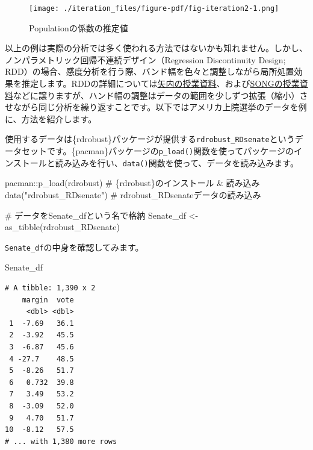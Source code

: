 \documentclass[
  a4paper,
  pandoc,
  ja=standard,
  jafont=haranoaji]{bxjsbook}
\newenvironment{Shaded}{\begin{snugshade}}{\end{snugshade}}
\newcommand{\CommentTok}[1]{\textcolor[rgb]{0.37,0.37,0.37}{#1}}
\newcommand{\FunctionTok}[1]{\textcolor[rgb]{0.28,0.35,0.67}{#1}}
\newcommand{\NormalTok}[1]{\textcolor[rgb]{0.00,0.48,0.65}{#1}}
\newcommand{\OtherTok}[1]{\textcolor[rgb]{0.00,0.48,0.65}{#1}}
\newcommand{\SpecialCharTok}[1]{\textcolor[rgb]{0.37,0.37,0.37}{#1}}
\newcommand{\StringTok}[1]{\textcolor[rgb]{0.13,0.47,0.30}{#1}}
\begin{document}
\begin{figure}[H]

{\centering \texttt{[image: ./iteration\_files/figure-pdf/fig-iteration2-1.png]}

}

\caption{\label{fig-iteration2}Populationの係数の推定値}

\end{figure}

以上の例は実際の分析では多く使われる方法ではないかも知れません。しかし、ノンパラメトリック回帰不連続デザイン（Regression
Discontinuity Design;
RDD）の場合、感度分析を行う際、バンド幅を色々と調整しながら局所処置効果を推定します。RDDの詳細については\href{https://yukiyanai.github.io/econometrics2/regression-discontinuity.html}{矢内の授業資料}、および\href{https://www.jaysong.net/post/kobe2020-qpm1/}{SONGの授業資料}などに譲りますが、ハンド幅の調整はデータの範囲を少しずつ拡張（縮小）させながら同じ分析を繰り返すことです。以下ではアメリカ上院選挙のデータを例に、方法を紹介します。

使用するデータは\{rdrobust\}パッケージが提供する\texttt{rdrobust\_RDsenate}というデータセットです。\{pacman\}パッケージの\texttt{p\_load()}関数を使ってパッケージのインストールと読み込みを行い、\texttt{data()}関数を使って、データを読み込みます。

\begin{Shaded}
\begin{Highlighting}[numbers=left,,]
\NormalTok{pacman}\SpecialCharTok{::}\FunctionTok{p\_load}\NormalTok{(rdrobust)  }\CommentTok{\# \{rdrobust\}のインストール \& 読み込み}
\FunctionTok{data}\NormalTok{(}\StringTok{"rdrobust\_RDsenate"}\NormalTok{) }\CommentTok{\# rdrobust\_RDsenateデータの読み込み}

\CommentTok{\# データをSenate\_dfという名で格納}
\NormalTok{Senate\_df }\OtherTok{\textless{}{-}} \FunctionTok{as\_tibble}\NormalTok{(rdrobust\_RDsenate)}
\end{Highlighting}
\end{Shaded}

\texttt{Senate\_df}の中身を確認してみます。

\begin{Shaded}
\begin{Highlighting}[numbers=left,,]
\NormalTok{Senate\_df}
\end{Highlighting}
\end{Shaded}

\begin{verbatim}
# A tibble: 1,390 x 2
    margin  vote
     <dbl> <dbl>
 1  -7.69   36.1
 2  -3.92   45.5
 3  -6.87   45.6
 4 -27.7    48.5
 5  -8.26   51.7
 6   0.732  39.8
 7   3.49   53.2
 8  -3.09   52.0
 9   4.70   51.7
10  -8.12   57.5
# ... with 1,380 more rows
\end{verbatim}
\end{document}
